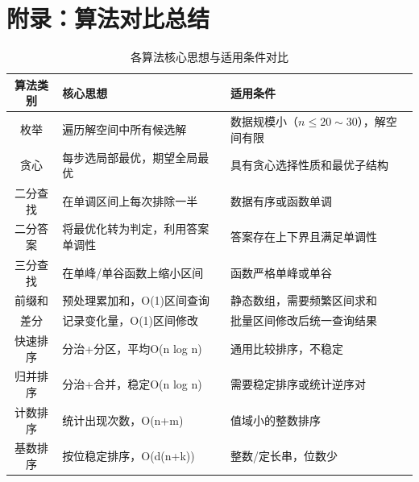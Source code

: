 \documentclass[12pt,a4paper]{ctexart}
\begin{document}
	\newpage
	\section*{附录：算法对比总结}
	
	\begin{table}[h]
		\centering
		\caption{各算法核心思想与适用条件对比}
		\begin{tabularx}{\textwidth}{cXX}
			\toprule
			\textbf{算法类别} & \textbf{核心思想} & \textbf{适用条件} \\
			\midrule
			枚举 & 遍历解空间中所有候选解 & 数据规模小（$n\le 20\sim30$），解空间有限 \\
			\midrule
			贪心 & 每步选局部最优，期望全局最优 & 具有贪心选择性质和最优子结构 \\
			\midrule
			二分查找 & 在单调区间上每次排除一半 & 数据有序或函数单调 \\
			\midrule
			二分答案 & 将最优化转为判定，利用答案单调性 & 答案存在上下界且满足单调性 \\
			\midrule
			三分查找 & 在单峰/单谷函数上缩小区间 & 函数严格单峰或单谷 \\
			\midrule
			前缀和 & 预处理累加和，O(1)区间查询 & 静态数组，需要频繁区间求和 \\
			\midrule
			差分 & 记录变化量，O(1)区间修改 & 批量区间修改后统一查询结果 \\
			\midrule
			快速排序 & 分治+分区，平均O(n log n) & 通用比较排序，不稳定 \\
			\midrule
			归并排序 & 分治+合并，稳定O(n log n) & 需要稳定排序或统计逆序对 \\
			\midrule
			计数排序 & 统计出现次数，O(n+m) & 值域小的整数排序 \\
			\midrule
			基数排序 & 按位稳定排序，O(d(n+k)) & 整数/定长串，位数少 \\
			\bottomrule
		\end{tabularx}
	\end{table}
	
\end{document}
